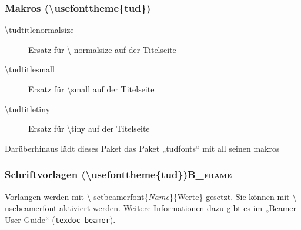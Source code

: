 \documentclass[presentation,t]{beamer}
\begin{document}
\subsubsection{Makros (\textbackslash usefonttheme\{tud\})}
\label{sec:org4ac21b2}
\begin{description}
\item[{\textbackslash tudtitlenormalsize}] Ersatz für \textbackslash
  normalsize auf der Titelseite
\item[{\textbackslash tudtitlesmall}] Ersatz für \textbackslash small auf der Titelseite
\item[{\textbackslash tudtitletiny}] Ersatz für \textbackslash tiny auf der Titelseite
\end{description}

Darüberhinaus lädt dieses Paket das Paket „tudfonts“ mit all seinen makros

\subsubsection[Schriftvorlagen (\textbackslash usefonttheme\{tud\})]{Schriftvorlagen (\textbackslash usefonttheme\{tud\})\hfill{}\textsc{B\_frame}}
\label{sec:org85b0d21}
Vorlangen werden mit \textbackslash
setbeamerfont\{\emph{Name}\}\{Werte\} gesetzt. Sie können mit \textbackslash
usebeamerfont aktiviert werden. Weitere Informationen dazu gibt es im
„Beamer User Guide“ (\texttt{texdoc beamer}).
\end{document}
